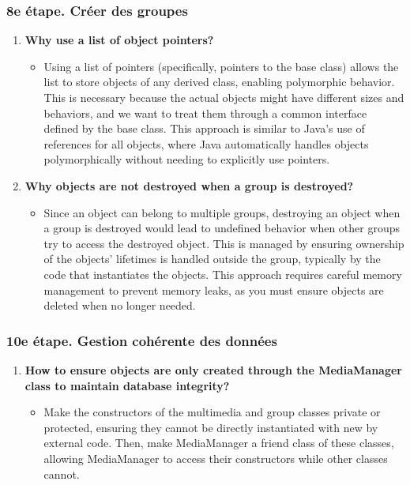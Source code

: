\documentclass[
]{article}
\providecommand{\tightlist}{%
  \setlength{\itemsep}{0pt}\setlength{\parskip}{0pt}}
\begin{document}
\subsubsection{8e étape. Créer des
groupes}\label{e-uxe9tape.-cruxe9er-des-groupes}

\begin{enumerate}
\def\labelenumi{\arabic{enumi}.}
\item
  \textbf{Why use a list of object pointers?}

  \begin{itemize}
  \tightlist
  \item
    Using a list of pointers (specifically, pointers to the base class)
    allows the list to store objects of any derived class, enabling
    polymorphic behavior. This is necessary because the actual objects
    might have different sizes and behaviors, and we want to treat them
    through a common interface defined by the base class. This approach
    is similar to Java’s use of references for all objects, where Java
    automatically handles objects polymorphically without needing to
    explicitly use pointers.
  \end{itemize}
\item
  \textbf{Why objects are not destroyed when a group is destroyed?}

  \begin{itemize}
  \tightlist
  \item
    Since an object can belong to multiple groups, destroying an object
    when a group is destroyed would lead to undefined behavior when
    other groups try to access the destroyed object. This is managed by
    ensuring ownership of the objects’ lifetimes is handled outside the
    group, typically by the code that instantiates the objects. This
    approach requires careful memory management to prevent memory leaks,
    as you must ensure objects are deleted when no longer needed.
  \end{itemize}
\end{enumerate}

\subsubsection{10e étape. Gestion cohérente des
données}\label{e-uxe9tape.-gestion-cohuxe9rente-des-donnuxe9es}

\begin{enumerate}
\def\labelenumi{\arabic{enumi}.}
\item
  \textbf{How to ensure objects are only created through the
  MediaManager class to maintain database integrity?}

  \begin{itemize}
  \tightlist
  \item
    Make the constructors of the multimedia and group classes private or
    protected, ensuring they cannot be directly instantiated with new by
    external code. Then, make MediaManager a friend class of these
    classes, allowing MediaManager to access their constructors while
    other classes cannot.
  \end{itemize}
\end{enumerate}
\end{document}
